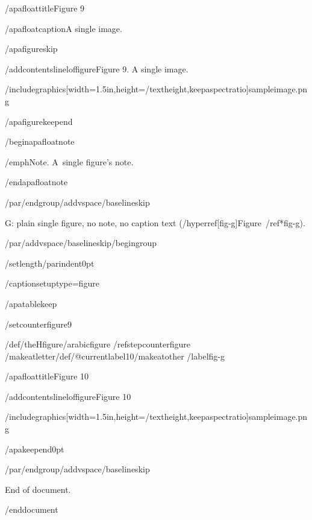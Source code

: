 /apafloattitle{Figure 9}

/apafloatcaption{A single image.}

/apafigureskip

/addcontentsline{lof}{figure}{Figure 9. A single image.}

/includegraphics[width=1.5in,height=/textheight,keepaspectratio]{sampleimage.png}

/apafigurekeepend

/begin{apafloatnote}

/emph{Note}. A~single figure's note.

/end{apafloatnote}

/par/endgroup/addvspace{/baselineskip}

G: plain single figure, no note, no caption text
(/hyperref[fig-g]{Figure~/ref*{fig-g}}).

/par/addvspace{/baselineskip}/begingroup

/setlength{/parindent}{0pt}

/captionsetup{type=figure}

/apatablekeep

/setcounter{figure}{9}

/def/theHfigure{/arabic{figure}}%
/refstepcounter{figure}%
/makeatletter/def/@currentlabel{10}/makeatother%
/label{fig-g}

/apafloattitle{Figure 10}

/addcontentsline{lof}{figure}{Figure 10}

/includegraphics[width=1.5in,height=/textheight,keepaspectratio]{sampleimage.png}

/apakeepend{0pt}

/par/endgroup/addvspace{/baselineskip}

End of document.




/end{document}
